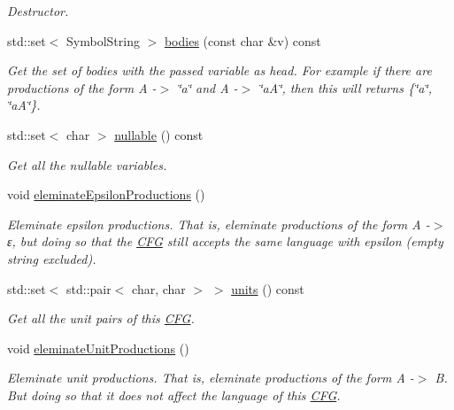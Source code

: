 \begin{DoxyCompactItemize}
\begin{DoxyCompactList}\small\item\em Destructor. \end{DoxyCompactList}\item 
std\-::set$<$ Symbol\-String $>$ \hyperlink{class_c_f_g_a391a7d2b5ef8145dff4c4b1d2c1dfe78}{bodies} (const char \&v) const 
\begin{DoxyCompactList}\small\item\em Get the set of bodies with the passed variable as head. For example if there are productions of the form A -\/$>$ \char`\"{}a\char`\"{} and A -\/$>$ \char`\"{}a\-A\char`\"{}, then this will returns \{\char`\"{}a\char`\"{}, \char`\"{}a\-A\char`\"{}\}. \end{DoxyCompactList}\item 
std\-::set$<$ char $>$ \hyperlink{class_c_f_g_a5df6f5e5f972ede1a2f1eb210a5e33d6}{nullable} () const 
\begin{DoxyCompactList}\small\item\em Get all the nullable variables. \end{DoxyCompactList}\item 
void \hyperlink{class_c_f_g_ac849b4a92eea2311a9626061b3e193b8}{eleminate\-Epsilon\-Productions} ()
\begin{DoxyCompactList}\small\item\em Eleminate epsilon productions. That is, eleminate productions of the form A -\/$>$ ε, but doing so that the \hyperlink{class_c_f_g}{C\-F\-G} still accepts the same language with epsilon (empty string excluded). \end{DoxyCompactList}\item 
std\-::set$<$ std\-::pair$<$ char, char $>$ $>$ \hyperlink{class_c_f_g_afe7d63958621b57a80d334827b9c6ceb}{units} () const 
\begin{DoxyCompactList}\small\item\em Get all the unit pairs of this \hyperlink{class_c_f_g}{C\-F\-G}. \end{DoxyCompactList}\item 
void \hyperlink{class_c_f_g_a61a4e75db20b0c39e0288c8f5146a8a6}{eleminate\-Unit\-Productions} ()
\begin{DoxyCompactList}\small\item\em Eleminate unit productions. That is, eleminate productions of the form A -\/$>$ B. But doing so that it does not affect the language of this \hyperlink{class_c_f_g}{C\-F\-G}. \end{DoxyCompactList}\item 

\end{DoxyCompactItemize}
